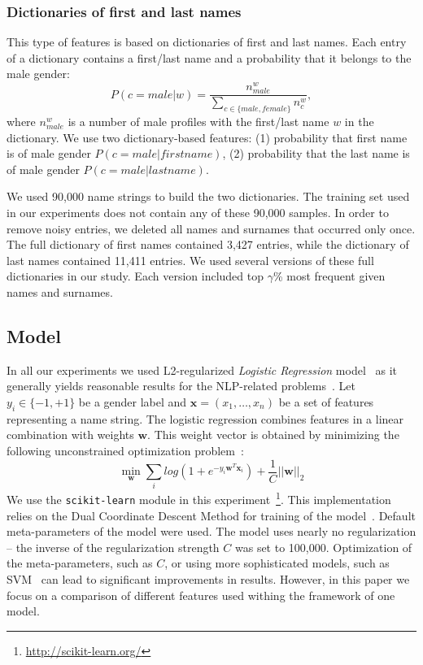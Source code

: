 \documentclass[runningheads,a4paper]{llncs}
\begin{document}
\subsubsection{Dictionaries of first and last names}

This type of features is based on dictionaries of first and last names. Each entry of a dictionary contains a first/last name and a probability that it belongs to the male gender:
$$
P(c=male|w) = \frac{n_{male}^w }{\sum_{c \in \{male, female\}} n_{c}^w}, 
$$
where $n_{male}^w$ is a number of male profiles with the first/last name $w$ in the dictionary. We use two dictionary-based features: (1) probability that first name is of male gender $P(c=male|firstname)$, (2) probability that the last name is of male gender $P(c=male|lastname)$. 

We used 90,000 name strings to build the two dictionaries. The training set used in our experiments does not contain any of these 90,000 samples. In order to remove noisy entries, we deleted all names and surnames that occurred only once. The full dictionary of first names contained 3,427 entries, while the dictionary of last names contained 11,411 entries. We used several versions of these full dictionaries in our study. Each version included top $\gamma$\% most frequent given names and surnames.    

\subsection{Model}

In all our experiments we used L2-regularized \textit{Logistic Regression} model~\cite{agresti2002categorical} as it generally yields reasonable results for the NLP-related problems~\cite{panchenko2013towards}.
Let $y_i \in \{-1,+1\}$ be a gender label and $\mathbf{x} = (x_1,\ldots,x_n)$ be a set of features  representing a name string. The logistic regression combines features in a linear combination with weights $\mathbf{w}$. This weight vector is obtained by minimizing the following unconstrained optimization problem~\cite{fan2008liblinear}:  
$$
\min_{\mathbf{w}} \sum_i log (1 + e^{-y_i\mathbf{w}^T \mathbf{x}_i}) + \frac{1}{C} || \mathbf{w} ||_2
$$
We use the \texttt{scikit-learn} module in this experiment~\footnote{\url{http://scikit-learn.org/}}. This implementation relies on the Dual Coordinate Descent Method for training of the model~\cite{yu2011dual}. Default meta-parameters of the model were used. The model uses nearly no regularization -- the inverse of the regularization strength $C$ was set to 100,000. Optimization of the meta-parameters, such as $C$,  or using more sophisticated models, such as SVM~\cite{vapnik} can lead to significant improvements in results. However, in this paper we focus on a comparison of different features used withing the framework of one model. 
\end{document}

